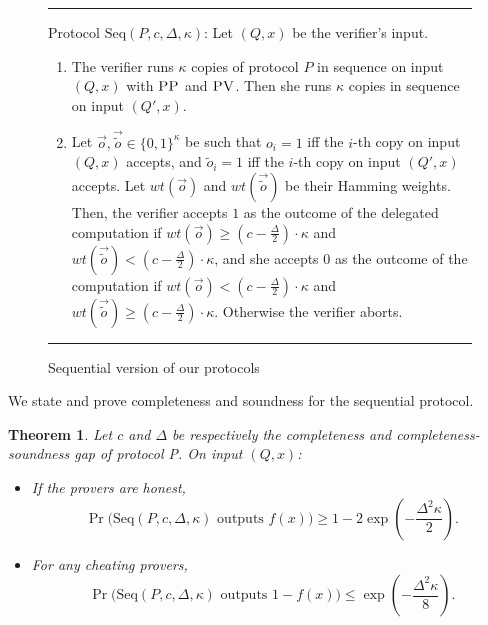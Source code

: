 \documentclass[11pt,letter]{article}
\newtheorem{theorem}{Theorem}
\theoremstyle{remark}
\theoremstyle{definition}
\newcommand{\pv}{\textsc{PV}}
\newcommand{\pp}{\textsc{PP}}
\begin{document}
\begin{figure}[H]
\rule[1ex]{16.5cm}{0.5pt}
\justify
Protocol $\mbox{Seq}(P,c,\Delta, \kappa)$: Let $(Q,x)$ be the verifier's input. 
\begin{enumerate}
\item The verifier runs $\kappa$ copies of protocol $P$ in sequence on input $(Q,x)$ with $\pp$ and $\pv$. Then she runs $\kappa$ copies in sequence on input $(Q',x)$. 
\item Let $\vec{o}, \vec{\tilde{o}} \in \{0,1\}^{\kappa}$ be such that $o_i = 1$ iff the $i$-th copy on input $(Q,x)$ accepts, and $\tilde{o}_i = 1$ iff the $i$-th copy on input $(Q',x)$ accepts. Let $wt(\vec{o})$ and $wt(\vec{\tilde{o}})$ be their Hamming weights. Then, the verifier accepts $1$ as the outcome of the delegated computation if $wt(\vec{o}) \geq (c- \frac{\Delta}{2}) \cdot \kappa$ and $wt(\vec{\tilde{o}}) < (c- \frac{\Delta}{2}) \cdot \kappa$, and she accepts $0$ as the outcome of the computation if $wt(\vec{o}) < (c- \frac{\Delta}{2})\cdot \kappa$ and $wt(\vec{\tilde{o}}) \geq (c- \frac{\Delta}{2}) \cdot \kappa$. Otherwise the verifier aborts.

\end{enumerate}
\rule[2ex]{16.5cm}{0.5pt}\vspace{-.5cm}
\caption{Sequential version of our protocols} \label{fig: gardenhose-protocol-parallel}
\end{figure}

\noindent We state and prove completeness and soundness for the sequential protocol.

\begin{theorem}
Let $c$ and $\Delta$ be respectively the completeness and completeness-soundness gap of protocol P. On input $(Q,x)$:
\begin{itemize}
\item If the provers are honest, $$ \Pr\big(\mbox{Seq}(P, c, \Delta, \kappa) \mbox{  outputs } f(x)\big) \geq 1 - 2\exp \left(-\frac{\Delta^2\kappa}{2}\right) .$$ 
\item For any cheating provers, $$\Pr\big(\mbox{Seq}(P, c, \Delta, \kappa) \mbox{  outputs } 1-f(x)\big) \leq \exp \left(-\frac{\Delta^2\kappa}{8}\right) .$$
\end{itemize}

\end{theorem}
\end{document}

